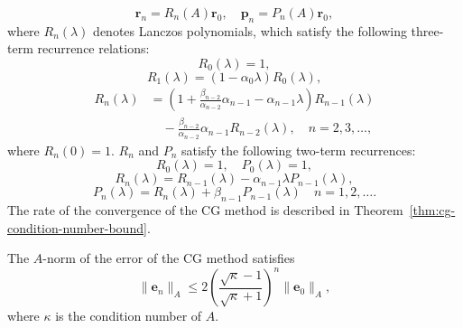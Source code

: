 \begin{equation}\label{eq:cg-residual-direction-polynomials}\bm r_n=R_n(A)\bm r_0,\quad\bm p_n=P_n(A)\bm r_0,\end{equation}
{where $R_n(\lambda)$ denotes Lanczos polynomials, which satisfy the following three-term recurrence relations:}
\begin{equation}\label{eq:cg-polynomial-initial-zero}R_0(\lambda)=1,\end{equation}
\begin{equation}\label{eq:cg-polynomial-initial-one}R_1(\lambda)=(1-\alpha_0\lambda)R_0(\lambda),\end{equation}
\begin{equation}\label{eq:cg-polynomial-three-term}
\begin{aligned}R_n(\lambda)&=\left(1+\frac{\beta_{n-2}}{\alpha_{n-2}}\alpha_{n-1}-\alpha_{n-1}\lambda\right)R_{n-1}(\lambda)\\
&\quad-\frac{\beta_{n-2}}{\alpha_{n-2}}\alpha_{n-1}R_{n-2}(\lambda),\quad n=2,3,\ldots,
\end{aligned}\end{equation}
{where $R_n(0)=1$. $R_n$ and $P_n$ satisfy the following two-term recurrences:}
\begin{equation}\label{eq:cg-two-term-polynomial-initial}R_0(\lambda)=1,\quad P_0(\lambda)=1,\end{equation}
\begin{equation}\label{eq:cg-residual-polynomial-recurrence}R_n(\lambda)=R_{n-1}(\lambda)-\alpha_{n-1}\lambda P_{n-1}(\lambda),\end{equation}
\begin{equation}\label{eq:cg-direction-polynomial-recurrence}P_n(\lambda)=R_n(\lambda)+\beta_{n-1}P_{n-1}(\lambda)\quad n=1,2,\ldots.\end{equation}
{The rate of the convergence of the CG method is described in Theorem\ \ref{thm:cg-condition-number-bound}.}
\begin{Theorem}\label{thm:cg-condition-number-bound}
{The $A$-norm of the error of the CG method satisfies}
\begin{equation}\label{eq:cg-condition-number-bound}
\|\bm e_n\|_A\le2\left(\frac{\sqrt\kappa-1}{\sqrt\kappa+1}\right)^n\|\bm e_0\|_A,
\end{equation}
{where $\kappa$ is the condition number of $A$.}
\end{Theorem}
